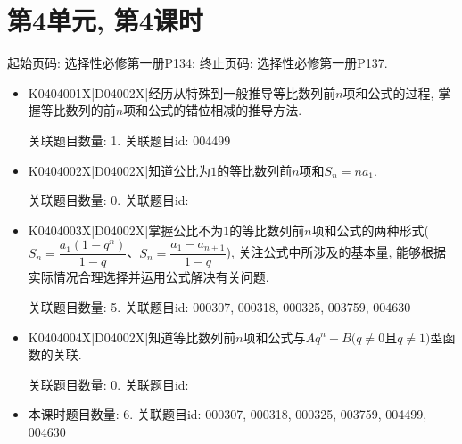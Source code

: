 \section*{第4单元, 第4课时}
起始页码: 选择性必修第一册P134; 终止页码: 选择性必修第一册P137.
\begin{itemize}
\item K0404001X|D04002X|经历从特殊到一般推导等比数列前$n$项和公式的过程, 掌握等比数列的前$n$项和公式的错位相减的推导方法.

关联题目数量: 1. 关联题目id: 004499

\item K0404002X|D04002X|知道公比为$1$的等比数列前$n$项和$S_{n}=na_{1}$.

关联题目数量: 0. 关联题目id: 

\item K0404003X|D04002X|掌握公比不为$1$的等比数列前$n$项和公式的两种形式($S_{n}=\dfrac{a_{1}(1-q^{n})}{1-q}$、$S_{n}=\dfrac{a_{1}-a_{n+1}}{1-q}$), 关注公式中所涉及的基本量, 能够根据实际情况合理选择并运用公式解决有关问题.

关联题目数量: 5. 关联题目id: 000307, 000318, 000325, 003759, 004630

\item K0404004X|D04002X|知道等比数列前$n$项和公式与$Aq^n+B(q\neq 0$且$q\neq 1)$型函数的关联.

关联题目数量: 0. 关联题目id: 

\item 本课时题目数量: 6. 关联题目id: 000307, 000318, 000325, 003759, 004499, 004630

\end{itemize}

